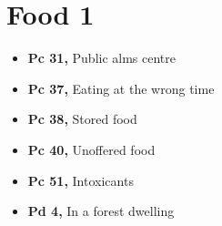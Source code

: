 \chapter{Food 1}

\begin{itemize}
\tightlist
\item
  \textbf{Pc 31,} Public alms centre
\item
  \textbf{Pc 37,} Eating at the wrong time
\item
  \textbf{Pc 38,} Stored food
\item
  \textbf{Pc 40,} Unoffered food
\item
  \textbf{Pc 51,} Intoxicants
\item
  \textbf{Pd 4,} In a forest dwelling
\end{itemize}

